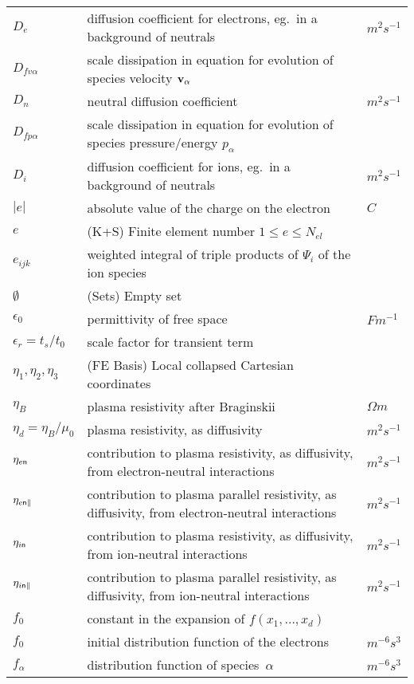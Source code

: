 \begin{longtable}{|p{3.0cm}|p{10.0cm}|p{3.0cm}|}
$D_e$ & diffusion coefficient for electrons, eg.\  in a background of neutrals  &  $m^2 s^{-1}$ \\
$D_{fv\alpha}$ & scale dissipation in  equation for evolution of species velocity ${\bf v}_\alpha$ & \\
$D_n$ & neutral diffusion coefficient  &  $m^2 s^{-1}$ \\
$D_{fp\alpha}$ & scale dissipation in  equation for evolution of species pressure/energy $p_\alpha$ & \\
$D_i$ & diffusion coefficient for ions, eg.\ in a background of neutrals  &  $m^2 s^{-1}$ \\
$|e|$ & absolute value of the charge on the electron & $C$ \\
$e$ &  (K+S) Finite element number $1 \leq e \leq N_{el}$ & \\
$e_{ijk}$ & weighted integral of triple products of $\Psi_i$ of the ion species & \\
$\emptyset$ &  (Sets) Empty set & \\
$\epsilon_0$ & permittivity of free space  &  $F m^{-1}$ \\
$\epsilon_r=t_s/t_0$ & scale factor for transient term  & \\
$\eta_1, \eta_2, \eta_3$ &  (FE Basis) Local collapsed Cartesian coordinates & \\
$\eta_B$ & plasma resistivity after Braginskii  &  $\Omega m$ \\
$\eta_d=\eta_B/\mu_0$ & plasma resistivity, as diffusivity  &  $m^2 s^{-1}$ \\
$\eta_{e{\sf n}}$ & contribution to plasma resistivity, as diffusivity, from electron-neutral interactions  &  $m^2 s^{-1}$ \\
$\eta_{e{\sf n}\|}$ & contribution to plasma parallel resistivity, as diffusivity, from electron-neutral interactions  &  $m^2 s^{-1}$ \\
$\eta_{i{\sf n}}$ & contribution to plasma resistivity, as diffusivity, from ion-neutral interactions  &  $m^2 s^{-1}$ \\
$\eta_{i{\sf n}\|}$ & contribution to plasma parallel resistivity, as diffusivity, from ion-neutral interactions  &  $m^2 s^{-1}$ \\
$f_0$ & constant in the expansion of $f\left(x_1,\ldots,x_d\right)$  & \\
$f_0$ & initial distribution function of the electrons & $m^{-6} s^3$ \\
$f_\alpha$ & distribution function of species~$\alpha$ & $m^{-6} s^3$ \\

\end{longtable}
